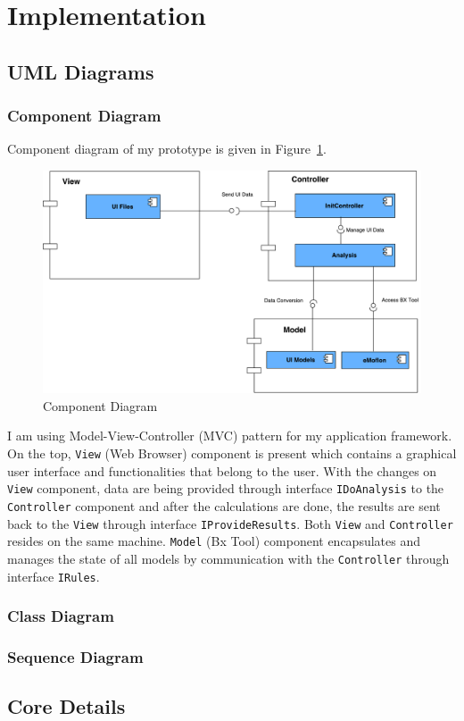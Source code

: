 \section{Implementation}\label{sec:implementation}

\subsection{UML Diagrams}\label{subsec:umldiagrams}
\subsubsection{Component Diagram}\label{subsubsec:component}
Component diagram of my prototype is given in Figure~\ref{fig:Component_Diagram}.
\begin{figure}
	\includegraphics[width=1\textwidth]{figures/Component_Diagram}
	\caption{Component Diagram}
	\label{fig:Component_Diagram}
\end{figure}

I am using Model-View-Controller (MVC) pattern for my application framework. 
On the top, \texttt{View} (Web Browser) component is present which contains a graphical user interface and functionalities that belong to the user. With the changes on \texttt{View} component, data are being provided through interface \texttt{IDoAnalysis} to the \texttt{Controller} component and after the calculations are done, the results are sent back to the \texttt{View} through interface \texttt{IProvideResults}. Both \texttt{View} and \texttt{Controller} resides on the same machine. \texttt{Model} (Bx Tool) component encapsulates and manages the state of all models by communication with the \texttt{Controller} through interface \texttt{IRules}.
\subsubsection{Class Diagram}\label{subsubsec:classes}
\subsubsection{Sequence Diagram}\label{subsubsec:sequence}

\subsection{Core Details}\label{subsec:coredetails}

 




